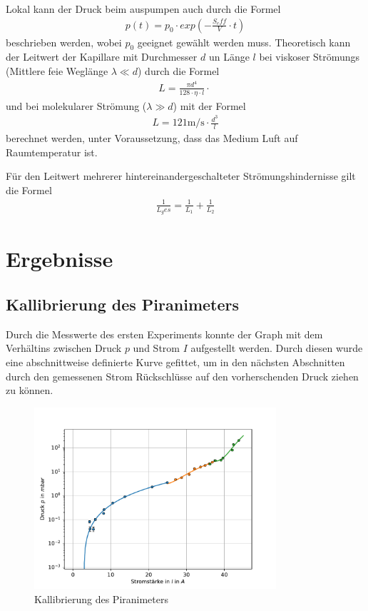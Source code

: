 \documentclass[11pt, a4paper]{article}
\begin{document}
    Lokal kann der Druck beim auspumpen auch durch die Formel
    \begin{align}
        p\left(t\right) = p_0 \cdot exp\left(- \frac{S_eff}{V} \cdot t\right)
    \end{align}
    beschrieben werden, wobei $p_0$ geeignet gewählt werden muss.
    Theoretisch kann der Leitwert der Kapillare mit Durchmesser $d$ un Länge $l$ bei viskoser Strömungs (Mittlere feie Weglänge $\lambda \ll d$) durch die Formel
    \begin{align}
        L = \frac{\pi d^4}{128 \cdot \eta \cdot l} \cdot \frac{}{}
    \end{align}
    und bei molekularer Strömung ($\lambda \gg d$) mit der Formel
    \begin{align}
        L = 121 \si{\meter\per\second} \cdot \frac{d^3}{l}
    \end{align}
    berechnet werden, unter Voraussetzung, dass das Medium Luft auf Raumtemperatur ist.

    Für den Leitwert mehrerer hintereinandergeschalteter Strömungshindernisse gilt die Formel
    \begin{align}
        \frac{1}{L_ges} = \frac{1}{L_1} + \frac{1}{L_2}
    \end{align}






    \section{Ergebnisse}

    \subsection{Kallibrierung des Piranimeters}

    Durch die Messwerte des ersten Experiments konnte der Graph mit dem Verhältins zwischen Druck $p$ und Strom $I$ aufgestellt werden. Durch diesen wurde eine abschnittweise definierte Kurve gefittet, um in den nächsten Abschnitten durch den gemessenen Strom Rückschlüsse auf den vorherschenden Druck ziehen zu können. 

    \begin{figure}[h]
        \centering
        \includegraphics[width=0.8\textwidth]{VAK/Kallibrierung.pdf}
        \caption{Kallibrierung des Piranimeters}
        \label{fig:piranim}
    \end{figure}
\end{document}
